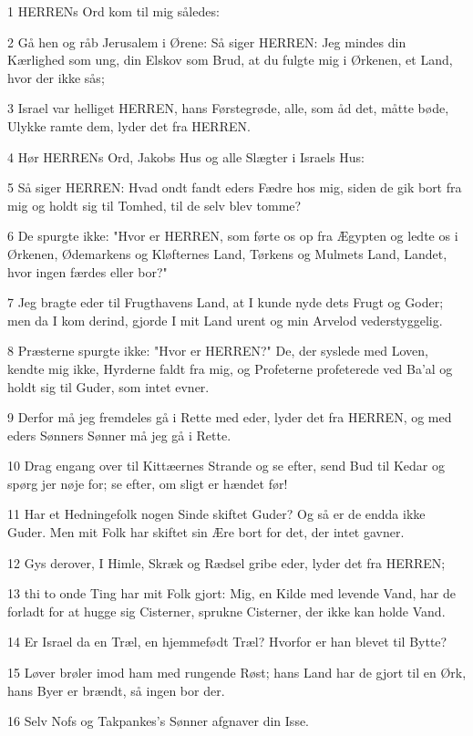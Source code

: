 \par 1 HERRENs Ord kom til mig således:
\par 2 Gå hen og råb Jerusalem i Ørene: Så siger HERREN: Jeg mindes din Kærlighed som ung, din Elskov som Brud, at du fulgte mig i Ørkenen, et Land, hvor der ikke sås;
\par 3 Israel var helliget HERREN, hans Førstegrøde, alle, som åd det, måtte bøde, Ulykke ramte dem, lyder det fra HERREN.
\par 4 Hør HERRENs Ord, Jakobs Hus og alle Slægter i Israels Hus:
\par 5 Så siger HERREN: Hvad ondt fandt eders Fædre hos mig, siden de gik bort fra mig og holdt sig til Tomhed, til de selv blev tomme?
\par 6 De spurgte ikke: "Hvor er HERREN, som førte os op fra Ægypten og ledte os i Ørkenen, Ødemarkens og Kløfternes Land, Tørkens og Mulmets Land, Landet, hvor ingen færdes eller bor?"
\par 7 Jeg bragte eder til Frugthavens Land, at I kunde nyde dets Frugt og Goder; men da I kom derind, gjorde I mit Land urent og min Arvelod vederstyggelig.
\par 8 Præsterne spurgte ikke: "Hvor er HERREN?" De, der syslede med Loven, kendte mig ikke, Hyrderne faldt fra mig, og Profeterne profeterede ved Ba'al og holdt sig til Guder, som intet evner.
\par 9 Derfor må jeg fremdeles gå i Rette med eder, lyder det fra HERREN, og med eders Sønners Sønner må jeg gå i Rette.
\par 10 Drag engang over til Kittæernes Strande og se efter, send Bud til Kedar og spørg jer nøje for; se efter, om sligt er hændet før!
\par 11 Har et Hedningefolk nogen Sinde skiftet Guder? Og så er de endda ikke Guder. Men mit Folk har skiftet sin Ære bort for det, der intet gavner.
\par 12 Gys derover, I Himle, Skræk og Rædsel gribe eder, lyder det fra HERREN;
\par 13 thi to onde Ting har mit Folk gjort: Mig, en Kilde med levende Vand, har de forladt for at hugge sig Cisterner, sprukne Cisterner, der ikke kan holde Vand.
\par 14 Er Israel da en Træl, en hjemmefødt Træl? Hvorfor er han blevet til Bytte?
\par 15 Løver brøler imod ham med rungende Røst; hans Land har de gjort til en Ørk, hans Byer er brændt, så ingen bor der.
\par 16 Selv Nofs og Takpankes's Sønner afgnaver din Isse.
